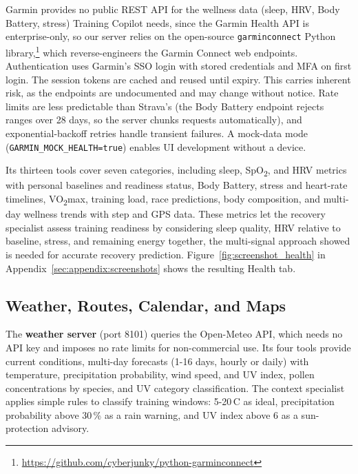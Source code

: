 Garmin provides no public REST API for the wellness data (sleep, HRV, Body Battery, stress) Training Copilot needs, since the Garmin Health API is enterprise-only, so our server relies on the open-source \texttt{garminconnect} Python library,\footnote{\url{https://github.com/cyberjunky/python-garminconnect}} which reverse-engineers the Garmin Connect web endpoints. Authentication uses Garmin's SSO login with stored credentials and MFA on first login. The session tokens are cached and reused until expiry. This carries inherent risk, as the endpoints are undocumented and may change without notice. Rate limits are less predictable than Strava's (the Body Battery endpoint rejects ranges over 28 days, so the server chunks requests automatically), and exponential-backoff retries handle transient failures. A mock-data mode (\texttt{GARMIN\_MOCK\_HEALTH=true}) enables UI development without a device.

Its thirteen tools cover seven categories, including sleep, SpO\textsubscript{2}, and HRV metrics with personal baselines and readiness status, Body Battery, stress and heart-rate timelines, VO\textsubscript{2}max, training load, race predictions, body composition, and multi-day wellness trends with step and GPS data. These metrics let the recovery specialist assess training readiness by considering sleep quality, HRV relative to baseline, stress, and remaining energy together, the multi-signal approach \cite{rothschild_predicting_2024} showed is needed for accurate recovery prediction. Figure~\ref{fig:screenshot_health} in Appendix~\ref{sec:appendix:screenshots} shows the resulting Health tab.

\subsection{Weather, Routes, Calendar, and Maps}\label{sec:data:other}

The \textbf{weather server} (port 8101) queries the Open-Meteo API, which needs no API key and imposes no rate limits for non-commercial use. Its four tools provide current conditions, multi-day forecasts (1-16 days, hourly or daily) with temperature, precipitation probability, wind speed, and UV index, pollen concentrations by species, and UV category classification. The context specialist applies simple rules to classify training windows: 5-20\,\textdegree C as ideal, precipitation probability above 30\,\% as a rain warning, and UV index above 6 as a sun-protection advisory.

